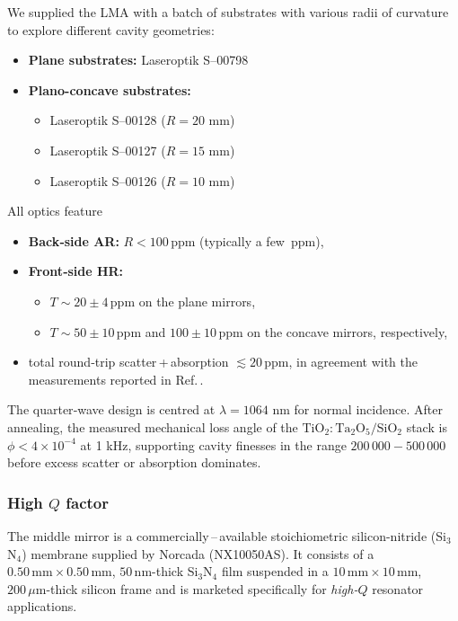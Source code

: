 We supplied the LMA with a batch of substrates with various radii of curvature to explore different cavity geometries:
\begin{itemize}
  \item \textbf{Plane substrates:} Laseroptik S--00798
  \item \textbf{Plano-concave substrates:}
    \begin{itemize}
        \item Laseroptik S--00128 ($R = 20$ mm)
        \item Laseroptik S--00127 ($R = 15$ mm)
        \item Laseroptik S--00126 ($R = 10$ mm)
    \end{itemize}
\end{itemize}

All optics feature
\begin{itemize}
  \item \textbf{Back‐side AR:} $R < 100\,$ppm (typically a few~ppm),
  \item \textbf{Front‐side HR:}
    \begin{itemize}
        \item[] $T \sim 20 \pm 4\,$ppm on the plane mirrors,
        \item[] $T \sim 50 \pm 10\,$ppm and $100 \pm 10\,$ppm on the
                concave mirrors, respectively,
    \end{itemize}
  \item total round‐trip scatter\,+\,absorption
        $\lesssim 20\,$ppm, in agreement with the measurements reported
        in Ref.\,\cite{AmatoPhD}.
\end{itemize}

The quarter‐wave design is centred at $\lambda = 1064$ nm for normal incidence.  After annealing, the measured mechanical loss angle of the $\mathrm{TiO_2\!:\!Ta_2O_5}/\mathrm{SiO_2}$ stack is $\phi < 4\times10^{-4}$ at 1 kHz, supporting cavity finesses in the range $200\,000-500\,000$ before excess scatter or absorption dominates\cite{AmatoPhD}.

\subsubsection{High $Q$ factor}

The middle mirror is a commercially\,–\,available stoichiometric silicon-nitride
(Si$_3$N$_4$) membrane supplied by Norcada (NX10050AS)\cite{SiN_review,Norcada_datasheet}.
It consists of a $0.50\,\mathrm{mm}\times0.50\,\mathrm{mm}$, $50\,\mathrm{nm}$-thick
Si$_3$N$_4$ film suspended in a $10\,\mathrm{mm}\times10\,\mathrm{mm}$,
$200\,\mu\mathrm{m}$-thick silicon frame and is marketed specifically for
\emph{high-$Q$} resonator applications.

